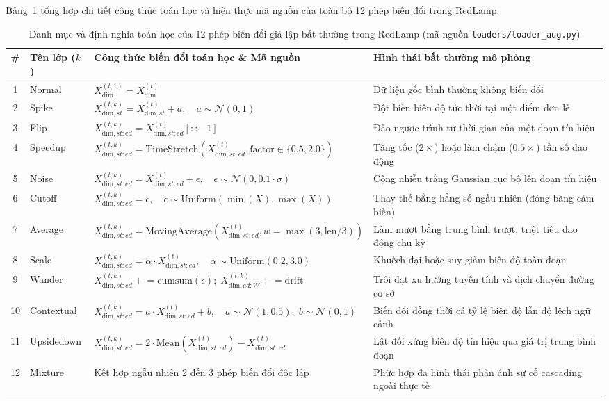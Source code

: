 \documentclass[sigconf,nonacm]{acmart}
\begin{document}
Bảng~\ref{tab:augmentations} tổng hợp chi tiết công thức toán học và hiện thực mã nguồn của toàn bộ 12 phép biến đổi trong RedLamp.

\begin{table}[t]
\centering
\caption{Danh mục và định nghĩa toán học của 12 phép biến đổi giả lập bất thường trong RedLamp (mã nguồn \texttt{loaders/loader\_aug.py})}
\label{tab:augmentations}
\footnotesize
\begin{tabularx}{\textwidth}{clXX}
\toprule
\textbf{\#} & \textbf{Tên lớp ($k$)} & \textbf{Công thức biến đổi toán học \& Mã nguồn} & \textbf{Hình thái bất thường mô phỏng} \\
\midrule
1 & Normal & $X^{(t,1)}_{\text{dim}} = X^{(t)}_{\text{dim}}$ & Dữ liệu gốc bình thường không biến đổi \\
2 & Spike & $X^{(t,k)}_{\text{dim},st} = X^{(t)}_{\text{dim},st} + a,\quad a \sim \mathcal{N}(0,1)$ & Đột biến biên độ tức thời tại một điểm đơn lẻ \\
3 & Flip & $X^{(t,k)}_{\text{dim},st:ed} = X^{(t)}_{\text{dim},st:ed}[::-1]$ & Đảo ngược trình tự thời gian của một đoạn tín hiệu \\
4 & Speedup & $X^{(t,k)}_{\text{dim},st:ed} = \text{TimeStretch}(X^{(t)}_{\text{dim},st:ed}, \text{factor} \in \{0.5, 2.0\})$ & Tăng tốc ($2\times$) hoặc làm chậm ($0.5\times$) tần số dao động \\
5 & Noise & $X^{(t,k)}_{\text{dim},st:ed} = X^{(t)}_{\text{dim},st:ed} + \epsilon,\quad \epsilon \sim \mathcal{N}(0, 0.1 \cdot \sigma)$ & Cộng nhiễu trắng Gaussian cục bộ lên đoạn tín hiệu \\
6 & Cutoff & $X^{(t,k)}_{\text{dim},st:ed} = c,\quad c \sim \text{Uniform}(\min(X), \max(X))$ & Thay thế bằng hằng số ngẫu nhiên (đóng băng cảm biến) \\
7 & Average & $X^{(t,k)}_{\text{dim},st:ed} = \text{MovingAverage}(X^{(t)}_{\text{dim},st:ed}, w=\max(3, \text{len}/3))$ & Làm mượt bằng trung bình trượt, triệt tiêu dao động chu kỳ \\
8 & Scale & $X^{(t,k)}_{\text{dim},st:ed} = \alpha \cdot X^{(t)}_{\text{dim},st:ed},\quad \alpha \sim \text{Uniform}(0.2, 3.0)$ & Khuếch đại hoặc suy giảm biên độ toàn đoạn \\
9 & Wander & $X^{(t,k)}_{\text{dim},st:ed} \mathrel{+}= \text{cumsum}(\epsilon);\; X^{(t,k)}_{\text{dim},ed:W} \mathrel{+}= \text{drift}$ & Trôi dạt xu hướng tuyến tính và dịch chuyển đường cơ sở \\
10 & Contextual & $X^{(t,k)}_{\text{dim},st:ed} = a \cdot X^{(t)}_{\text{dim},st:ed} + b,\quad a \sim \mathcal{N}(1, 0.5),\; b \sim \mathcal{N}(0, 1)$ & Biến đổi đồng thời cả tỷ lệ biên độ lẫn độ lệch ngữ cảnh \\
11 & Upsidedown & $X^{(t,k)}_{\text{dim},st:ed} = 2 \cdot \text{Mean}(X^{(t)}_{\text{dim},st:ed}) - X^{(t)}_{\text{dim},st:ed}$ & Lật đối xứng biên độ tín hiệu qua giá trị trung bình đoạn \\
12 & Mixture & Kết hợp ngẫu nhiên 2 đến 3 phép biến đổi độc lập & Phức hợp đa hình thái phản ánh sự cố cascading ngoài thực tế \\
\bottomrule
\end{tabularx}
\end{table}
\end{document}

